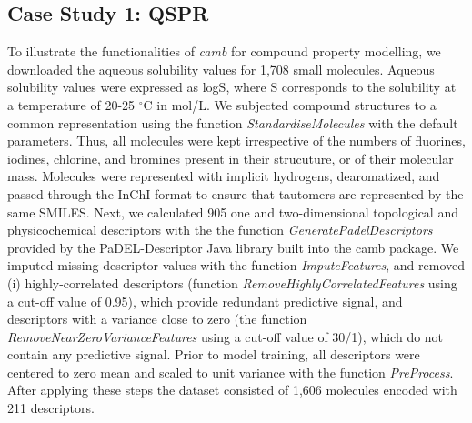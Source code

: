 \documentclass[twoside,a4wide,10pt]{article}
\begin{document}
\subsection{Case Study 1: QSPR}

To illustrate the functionalities of {\it camb} for compound property modelling,
we downloaded the aqueous solubility values for 1,708 small molecules.
Aqueous solubility values were expressed as logS, where S corresponds to the solubility at a temperature of 20-25 $^{\circ}$C in mol/L.
We subjected compound structures to a common representation using the function 
{\it StandardiseMolecules} with the default parameters.
Thus, all molecules were kept irrespective of the numbers of fluorines, iodines, chlorine, and bromines
present in their strucuture, or of their molecular mass.
Molecules were represented with implicit hydrogens, dearomatized, 
and passed through the InChI format to ensure that tautomers are represented by the same SMILES. %
Next, we calculated 905 one and two-dimensional topological and
physicochemical descriptors with the the function {\it GeneratePadelDescriptors}
provided by the PaDEL-Descriptor \citep{padel} Java library built into the camb package.
We imputed missing descriptor values with the function {\it ImputeFeatures},
and removed (i) highly-correlated descriptors (function {\it RemoveHighlyCorrelatedFeatures} using a cut-off value of 0.95), 
which provide redundant predictive signal, 
and descriptors with a variance close to zero (the function {\it RemoveNearZeroVarianceFeatures} using a cut-off value of 30/1),
which do not contain any predictive signal.
Prior to model training, all descriptors were centered to zero mean and scaled to unit variance
with the function {\it PreProcess}.
After applying these steps the dataset consisted of 1,606 molecules
encoded with 211 descriptors.\\
\end{document}
